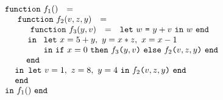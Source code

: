 \begin{equation}
\label{FunctionalConstructionProgram3}
\begin{array}{l}
  \begin{array}{lcl}\texttt{function}\ f_1() & = & \end{array}\\
  \quad
   \begin{array}[t]{l} 
     \begin{array}{lcl}\texttt{function}\ f_2(v,z,y) & = & \end{array}\\
     \quad \begin{array}{l}  
             \begin{array}{lcl}\texttt{function}\ f_3(y,v) & = & \letin w {y+v} w\end{array}\\
             \, \texttt{in}\
              \begin{array}[t]{l}
                \texttt{let}\ x = {5+y},\
                              y = {x*z},\
                              x = {x-1}\\
                \texttt{in}\ \ite {x=0} {\call {f_3} {y,v}} {\call {f_2} {v,z,y}}\ 
                 \texttt{end} 
              \end{array}\\
             \texttt{end}
           \end{array}\\
     \, \texttt{in\ let}\ v = 1,\ z = 8,\ y = 4\ \texttt{in}\ {\call {f_2} {v,z,y}}\ \texttt{end}\\
     \, \texttt{end}
   \end{array}\\
\begin{array}{lcl}
  \texttt{in}\ f_1()\ \texttt{end}
\end{array} 
\end{array}
\end{equation}

